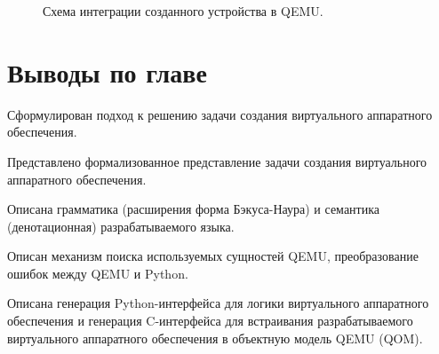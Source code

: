 \begin{figure}[!htbp]
    \centering
    
    \caption{Схема интеграции созданного устройства в QEMU.}\label{fig:qemu-compilation}
\end{figure}


\section*{Выводы по главе}\label{sec:ch2/sec4}

Сформулирован подход к решению задачи создания виртуального аппаратного обеспечения.

Представлено формализованное представление задачи
создания виртуального аппаратного обеспечения.

Описана грамматика (расширения форма Бэкуса-Наура) и семантика (денотационная) разрабатываемого языка.

Описан механизм поиска используемых сущностей QEMU, преобразование
ошибок между QEMU и Python.

Описана генерация Python-интерфейса для логики виртуального аппаратного обеспечения и
генерация C-интерфейса для встраивания разрабатываемого виртуального аппаратного
обеспечения в объектную модель QEMU (QOM).

